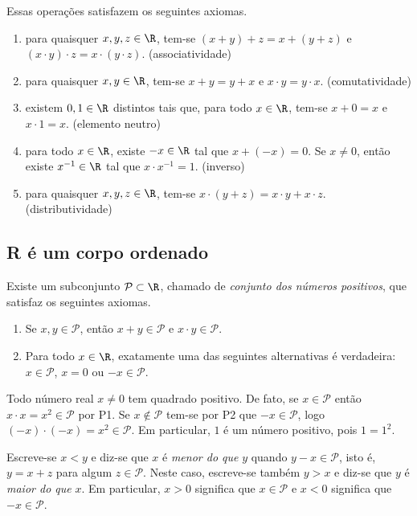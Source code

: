 \documentclass{article}
\begin{document}
Essas operações satisfazem os seguintes axiomas.
\begin{enumerate}
    \item [\textbf{AI}] para quaisquer \(x, y, z \in \R\), tem-se \((x + y) + z = x + (y + z)\) e \((x \cdot y) \cdot z = x \cdot (y \cdot z)\). \hfill (associatividade)
    \item [\textbf{AII}] para quaisquer \(x, y \in \R\), tem-se \(x + y = y + x\) e \(x \cdot y = y \cdot x\). \hfill (comutatividade)
    \item [\textbf{AIII}] existem \(0, 1 \in \R\) distintos tais que, para todo \(x \in \R\), tem-se \(x + 0 = x\) e \(x \cdot 1 = x\). \hfill (elemento neutro)
    \item [\textbf{AIV}] para todo \(x \in \R\), existe \(-x \in \R\) tal que \(x + (-x) = 0\). Se \(x \neq 0\), então existe \(x^{-1} \in \R\) tal que \(x \cdot x^{-1} = 1\). \hfill (inverso)
    \item [\textbf{AV}] para quaisquer \(x, y, z \in \R\), tem-se \(x \cdot (y + z) = x \cdot y + x \cdot z\). \hfill (distributividade)
\end{enumerate}

\subsection{R é um corpo ordenado}

Existe um subconjunto \(\mathcal{P} \subset \R\), chamado de \emph{conjunto dos números positivos}, que satisfaz os seguintes axiomas.
\begin{enumerate}
    \item [\textbf{P1}] Se \(x, y \in \mathcal{P}\), então \(x + y \in \mathcal{P}\) e \(x \cdot y \in \mathcal{P}\).
    \item [\textbf{P2}] Para todo \(x \in \R\), exatamente uma das seguintes alternativas é verdadeira: \(x \in \mathcal{P}\), \(x = 0\) ou \(-x \in \mathcal{P}\).
\end{enumerate}

\begin{rem}
    Todo número real \(x \neq 0\) tem quadrado positivo. De fato, se \(x \in \mathcal{P}\) então \(x \cdot x = x^2 \in \mathcal{P}\) por P1. Se \(x \notin \mathcal{P}\) tem-se por P2 que \(-x \in \mathcal{P}\), logo \((-x) \cdot (-x) = x^2 \in \mathcal{P}\). Em particular, \(1\) é um número positivo, pois \(1 = 1^2\).
\end{rem}

\begin{defn}
    Escreve-se \(x<y\) e diz-se que \(x\) é \emph{menor do que} \(y\) quando \(y - x \in \mathcal{P}\), isto é, \(y = x+z\) para algum \(z \in \mathcal{P}\). Neste caso, escreve-se também \(y > x\) e diz-se que \(y\) é \emph{maior do que} \(x\). Em particular, \(x>0\) significa que \(x \in \mathcal{P}\) e \(x<0\) significa que \(-x \in \mathcal{P}\).
\end{defn}
\end{document}
